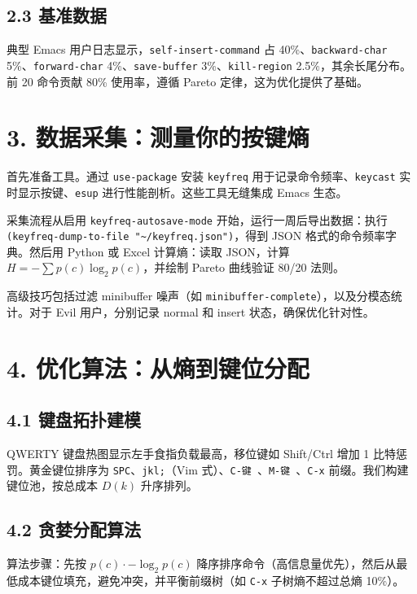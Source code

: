 \section{2.3 基准数据}
典型 Emacs 用户日志显示，\texttt{self-insert-command} 占 40\%{}、\texttt{backward-char} 5\%{}、\texttt{forward-char} 4\%{}、\texttt{save-buffer} 3\%{}、\texttt{kill-region} 2.5\%{}，其余长尾分布。前 20 命令贡献 80\%{} 使用率，遵循 Pareto 定律，这为优化提供了基础。\par
\chapter{3. 数据采集：测量你的按键熵}
首先准备工具。通过 \texttt{use-package} 安装 \texttt{keyfreq} 用于记录命令频率、\texttt{keycast} 实时显示按键、\texttt{esup} 进行性能剖析。这些工具无缝集成 Emacs 生态。\par
采集流程从启用 \texttt{keyfreq-autosave-mode} 开始，运行一周后导出数据：执行 \texttt{(keyfreq-dump-to-file "\~{}/keyfreq.json")}，得到 JSON 格式的命令频率字典。然后用 Python 或 Excel 计算熵：读取 JSON，计算 $H = -\sum p(c) \log _2 p(c)$，并绘制 Pareto 曲线验证 80/20 法则。\par
高级技巧包括过滤 minibuffer 噪声（如 \texttt{minibuffer-complete}），以及分模态统计。对于 Evil 用户，分别记录 normal 和 insert 状态，确保优化针对性。\par
\chapter{4. 优化算法：从熵到键位分配}
\section{4.1 键盘拓扑建模}
QWERTY 键盘热图显示左手食指负载最高，移位键如 Shift/Ctrl 增加 1 比特惩罚。黄金键位排序为 \texttt{SPC}、\texttt{jkl;}（Vim 式）、\texttt{C-键 }、\texttt{M-键 }、\texttt{C-x} 前缀。我们构建键位池，按总成本 $D(k)$ 升序排列。\par
\section{4.2 贪婪分配算法}
算法步骤：先按 $p(c) \cdot -\log _2 p(c)$ 降序排序命令（高信息量优先），然后从最低成本键位填充，避免冲突，并平衡前缀树（如 \texttt{C-x} 子树熵不超过总熵 10\%{}）。\par
